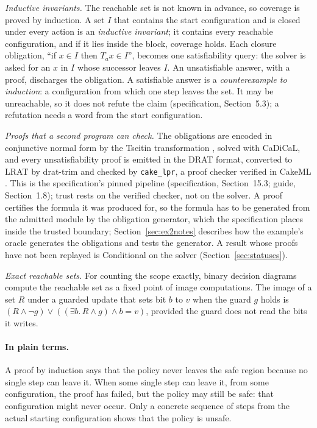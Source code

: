 \documentclass[11pt]{article}
\newcommand{\code}[1]{\texttt{#1}}
\newcommand{\plain}{\paragraph{In plain terms.}}
\newcommand{\spec}[1]{specification, Section~#1}
\theoremstyle{definition}
\theoremstyle{plain}
\begin{document}
\emph{Inductive invariants.} The reachable set is not known in advance, so coverage is proved by
induction. A set $I$ that contains the start configuration and is closed under every action is an
\emph{inductive invariant}; it contains every reachable configuration, and if it lies inside the
block, coverage holds. Each closure obligation, ``if $x\in I$ then $T_a x\in I$'', becomes one
satisfiability query: the solver is asked for an $x$ in $I$ whose successor leaves $I$. An
unsatisfiable answer, with a proof, discharges the obligation. A satisfiable answer is a
\emph{counterexample to induction}: a configuration from which one step leaves the set. It may be
unreachable, so it does not refute the claim (\spec{5.3}); a refutation needs a word from the start
configuration.

\emph{Proofs that a second program can check.} The obligations are encoded in conjunctive normal
form by the Tseitin transformation \cite{tseitin}, solved with CaDiCaL, and every unsatisfiability
proof is emitted in the DRAT format, converted to LRAT by drat-trim \cite{dratrim} and checked by
\code{cake\_lpr}, a proof checker verified in CakeML \cite{cakelpr}. This is the specification's
pinned pipeline (\spec{15.3}; guide, Section~1.8); trust rests on the verified checker, not on the
solver. A proof certifies the formula it was produced for, so the formula has to be generated from
the admitted module by the obligation generator, which the specification places inside the trusted
boundary; Section~\ref{sec:ex2notes} describes how the example's oracle generates the obligations
and tests the generator. A result whose proofs have not been replayed is Conditional on the solver
(Section~\ref{sec:statuses}).

\emph{Exact reachable sets.} For counting the scope exactly, binary decision diagrams
\cite{bryant} compute the reachable set as a fixed point of image computations. The image of a set
$R$ under a guarded update that sets bit $b$ to $v$ when the guard $g$ holds is
$(R\wedge\neg g)\vee((\exists b.\,R\wedge g)\wedge b=v)$, provided the guard does not read the bits it
writes.

\plain A proof by induction says that the policy never leaves the safe region because no single
step can leave it. When some single step can leave it, from some configuration, the proof has
failed, but the policy may still be safe: that configuration might never occur. Only a concrete
sequence of steps from the actual starting configuration shows that the policy is unsafe.
\end{document}
